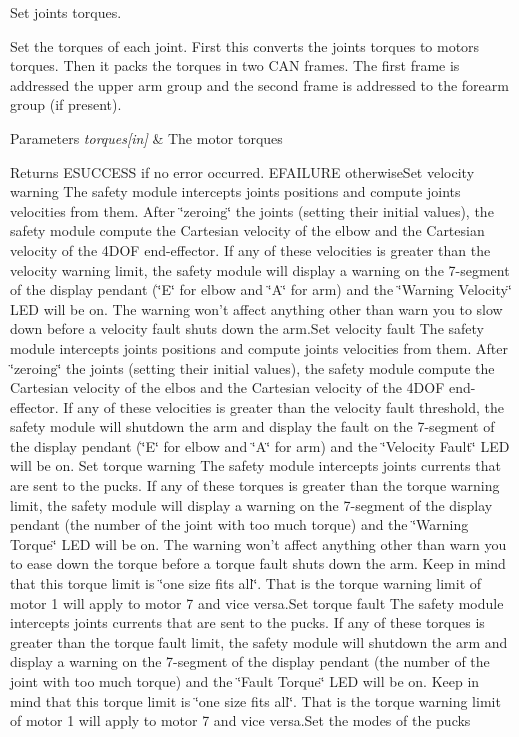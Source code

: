 Set joints torques. 

Set the torques of each joint. First this converts the joints torques to motors torques. Then it packs the torques in two C\-A\-N frames. The first frame is addressed the upper arm group and the second frame is addressed to the forearm group (if present). 
\begin{DoxyParams}{Parameters}
{\em torques\mbox{[}in\mbox{]}} & The motor torques \\
\hline
\end{DoxyParams}
\begin{DoxyReturn}{Returns}
E\-S\-U\-C\-C\-E\-S\-S if no error occurred. E\-F\-A\-I\-L\-U\-R\-E otherwise\-Set velocity warning The safety module intercepts joints positions and compute joints velocities from them. After \char`\"{}zeroing\char`\"{} the joints (setting their initial values), the safety module compute the Cartesian velocity of the elbow and the Cartesian velocity of the 4\-D\-O\-F end-\/effector. If any of these velocities is greater than the velocity warning limit, the safety module will display a warning on the 7-\/segment of the display pendant (\char`\"{}\-E\char`\"{} for elbow and \char`\"{}\-A\char`\"{} for arm) and the \char`\"{}\-Warning Velocity\char`\"{} L\-E\-D will be on. The warning won't affect anything other than warn you to slow down before a velocity fault shuts down the arm.\-Set velocity fault The safety module intercepts joints positions and compute joints velocities from them. After \char`\"{}zeroing\char`\"{} the joints (setting their initial values), the safety module compute the Cartesian velocity of the elbos and the Cartesian velocity of the 4\-D\-O\-F end-\/effector. If any of these velocities is greater than the velocity fault threshold, the safety module will shutdown the arm and display the fault on the 7-\/segment of the display pendant (\char`\"{}\-E\char`\"{} for elbow and \char`\"{}\-A\char`\"{} for arm) and the \char`\"{}\-Velocity Fault\char`\"{} L\-E\-D will be on. Set torque warning The safety module intercepts joints currents that are sent to the pucks. If any of these torques is greater than the torque warning limit, the safety module will display a warning on the 7-\/segment of the display pendant (the number of the joint with too much torque) and the \char`\"{}\-Warning 
\-Torque\char`\"{} L\-E\-D will be on. The warning won't affect anything other than warn you to ease down the torque before a torque fault shuts down the arm. Keep in mind that this torque limit is \char`\"{}one size fits all\char`\"{}. That is the torque warning limit of motor 1 will apply to motor 7 and vice versa.\-Set torque fault The safety module intercepts joints currents that are sent to the pucks. If any of these torques is greater than the torque fault limit, the safety module will shutdown the arm and display a warning on the 7-\/segment of the display pendant (the number of the joint with too much torque) and the \char`\"{}\-Fault Torque\char`\"{} L\-E\-D will be on. Keep in mind that this torque limit is \char`\"{}one size fits all\char`\"{}. That is the torque warning limit of motor 1 will apply to motor 7 and vice versa.\-Set the modes of the pucks 
\end{DoxyReturn}
